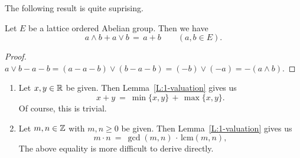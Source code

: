 \documentclass[main.tex]{subfiles}
\begin{document}
The following result is quite suprising.
%
%
\begin{lem}
\label{L:1-valuation}
Let $E$ be a lattice ordered Abelian group.
Then we have 
\begin{equation*}
a\wedge b  + a\vee b \,=\, a+b \qquad(a,b\in E).
\end{equation*}
\end{lem}
\begin{proof}
$a\vee b - a - b
= (a - a - b) \vee (b - a - b)
= (-b)\vee(-a) = -(a\wedge b)$.
\end{proof}
\begin{exs}
\begin{enumerate}
\item
Let $x,y\in \mathbb{R}$ be given.
Then Lemma~\ref{L:1-valuation}
gives us
\begin{equation*}
x+y\ =\ \min\{x,y\} \,+\, \max\{x,y\}.
\end{equation*}
Of course, this is trivial.

\item
Let $m,n\in \mathbb{Z}$ with $m,n\geq 0$ be given.
Then Lemma~\ref{L:1-valuation}
gives us
\begin{equation*}
m\cdot n \ =\ \gcd(m,n) \,\cdot\,\mathrm{lcm}(m,n),
\end{equation*}
The above equality is more difficult to derive directly.
\end{enumerate}
\end{exs}
\end{document}
